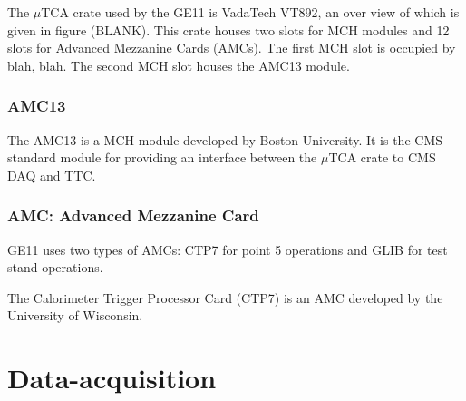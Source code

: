 The $\mu$TCA crate used by the GE11 is VadaTech VT892, an over view of which is given in figure (BLANK). This crate houses two slots for MCH modules and 12 slots for Advanced Mezzanine Cards (AMCs). The first MCH slot is occupied by blah, blah. The second MCH slot houses the AMC13 module.

\subsubsection{AMC13}

The AMC13 is a MCH module developed by Boston University. It is the CMS standard module for providing an interface between the $\mu$TCA crate to CMS DAQ and TTC.

\subsubsection{AMC: Advanced Mezzanine Card}

GE11 uses two types of AMCs: CTP7 for point 5 operations and GLIB for test stand operations.

The Calorimeter Trigger Processor Card (CTP7) is an AMC developed by the University of Wisconsin. 

\section{Data-acquisition}
%